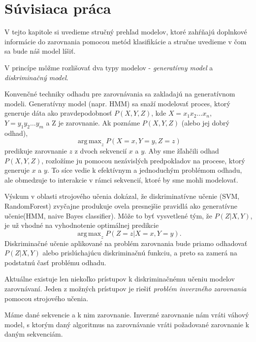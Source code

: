 \chapter{Súvisiaca práca}

V tejto kapitole si uvedieme stručný prehľad modelov, ktoré zahŕňajú doplnkové informácie do zarovnania pomocou metód klasifikácie a stručne uvedieme v čom sa bude náš model líšiť.

V princípe môžme rozlišovať dva typy modelov - \textit{generatívny model} a \textit{diskriminačný model}.

Konvenčné techniky odhadu pre zarovnávania sa zakladajú na generatívnom modeli. Generatívny model (napr. HMM) sa snaží modelovať proces, ktorý generuje dáta ako pravdepodobnosť $P(X,Y,Z)$, kde $X = x_1x_2\dots x_n$, $Y = y_1y_2\dots y_m$ a Z je zarovnanie. Ak poznáme $P(X,Y,Z)$ (alebo jej dobrý odhad),
$$\operatorname{ arg\,max}_z P(X = x,Y = y,Z = z)$$
predikuje zarovnanie $z$ z dvoch sekvencií $x$ a $y$. Aby sme žľahčili odhad $P(X,Y,Z)$, rozložíme ju pomocou nezávislých predpokladov na procese, ktorý generuje $x$ a $y$. To síce vedie k efektívnym a jednoduchým problémom odhadu, ale obmedzuje to interakcie v rámci sekvencií, ktoré by sme mohli modelovať. \cite{svmTrainingProteinsAlignment}

Výskum v oblasti strojového učenia dokázal, že diskriminatívne učenie (SVM, RandomForest) zvyčajne produkuje ovela presnejšie pravidlá ako generatívne učenie(HMM, naive Bayes classifier).
Môže to byť vysvetlené tým, že $P(Z|X,Y)$, je už vhodné na vyhodnotenie optimálnej predikcie
$$\operatorname{ arg\,max}_z P(Z = z|X = x,Y = y).$$
Diskriminačné učenie aplikované na problém zarovnania bude priamo odhadovať $P(Z|X,Y)$ alebo prislúchajúcu diskriminačnú funkciu, a preto sa zamerá na podstatnú časť problému odhadu. \cite{svmTrainingProteinsAlignment}

Aktuálne existuje len niekoľko prístupov k diskriminačnému učeniu modelov zarovnávaní. 
Jeden z možných prístupov je riešiť \textit{problém inverzného zarovnania} pomocou strojového učenia. \cite{svmTrainingProteinsAlignment}

\begin{df}
Máme dané sekvencie a k nim zarovnanie. Inverzné zarovnanie nám vráti váhový model, s ktorým daný algoritmus na zarovnávanie vráti požadované zarovnanie k daným sekvenciám.
\end{df}

